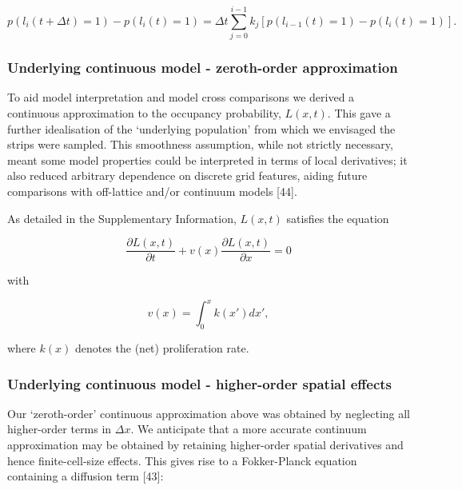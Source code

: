 \documentclass[10pt,letterpaper]{article}
\begin{document}
\begin{equation}p(l_i(t+\Delta t)=1) - p(l_i(t)=1) = \Delta t\sum_{j=0}^{i-1}k_j\left[p(l_{i-1}(t)=1)-p(l_i(t)=1)\right]. \label{eq:label-master-discrete-cons}\end{equation}

\subsubsection{Underlying continuous model - zeroth-order
approximation}\label{underlying-continuous-model---zeroth-order-approximation}

To aid model interpretation and model cross comparisons we derived a
continuous approximation to the occupancy probability, \(L(x,t)\). This
gave a further idealisation of the `underlying population' from which we
envisaged the strips were sampled. This smoothness assumption, while not
strictly necessary, meant some model properties could be interpreted in
terms of local derivatives; it also reduced arbitrary dependence on
discrete grid features, aiding future comparisons with off-lattice
and/or continuum models {[}44{]}.

As detailed in the Supplementary Information, \(L(x,t)\) satisfies the
equation

\begin{equation}\frac{\partial L(x,t)}{\partial t} + v(x)\frac{\partial L(x,t)}{\partial x} = 0\label{eq:model-pde}\end{equation}

with

\begin{equation}v(x) = \int_0^{x} k(x') dx',\label{eq:model-veloc}\end{equation}

where \(k(x)\) denotes the (net) proliferation rate.

\subsubsection{Underlying continuous model - higher-order spatial
effects}\label{underlying-continuous-model---higher-order-spatial-effects}

Our `zeroth-order' continuous approximation above was obtained by
neglecting all higher-order terms in \(\Delta x\). We anticipate that a
more accurate continuum approximation may be obtained by retaining
higher-order spatial derivatives and hence finite-cell-size effects.
This gives rise to a Fokker-Planck equation containing a diffusion term
{[}43{]}:
\end{document}
